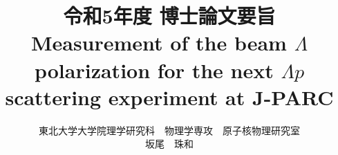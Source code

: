 \documentclass[a4paper,11pt,twoside,twocolumn]{article}
\begin{document}
\newcommand{\XM}{\Xi^{-}}
\newcommand{\Xz}{\Xi^{0}}

\newcommand{\pM}{\pi^{-}}
\newcommand{\pP}{\pi^{+}}
\newcommand{\pZ}{\pi^{0}}
\newcommand{\pPM}{\pi^{\pm}}
\newcommand{\KP}{K^{+}}
\newcommand{\KM}{K^{-}}
\newcommand{\Kz}{K^{0}}
\newcommand{\Lp}{\Lambda p}
\newcommand{\LpLX}{\Lambda p \to \Lambda X}

\newcommand{\LN}{\Lambda N}
\newcommand{\SN}{\Sigma N}
\newcommand{\LNtoSN}{\Lambda N\to\Sigma N}
\newcommand{\LS}{\Lambda - \Sigma}


\newcommand{\dcs}{d\sigma/d\Omega}
\newcommand{\fdcs}{\frac{d\sigma}{d\Omega}}
\newcommand{\dz}{\Delta z}
\newcommand{\dzkz}{\Delta z_{K^{0}}}


\newcommand{\bgct}{\beta\gamma c\tau}

\newcommand{\costp}{\cos{\theta_p}}
\newcommand{\costkz}{\cos{\theta_{K0,CM}}}
\newcommand{\costcm}{\cos{\theta}_{CM}}
\newcommand{\PL}{P_{\Lambda}}
\newcommand{\PLall}{P_{\Lambda,\ all}}
\newcommand{\PLsele}{P_{\Lambda,\ selected}}
\newcommand{\errPL}{\sigma(P_{\Lambda})}

\newcommand{\rud}{r_{ud}}
\newcommand{\errrud}{\sigma(\rud)}

\newcommand{\accPL}{\epsilon_{\PL}}
\newcommand{\erraccPL}{\sigma(\epsilon_{\PL})}

\newcommand{\PLscat}{P_{\Lambda'}}
\newcommand{\effPLw}{\epsilon_{\PL,\ w/}}
\newcommand{\erreffPLw}{\sigma(\epsilon_{\PL,\ w/})}
\newcommand{\effPLwo}{\epsilon_{\PL,\ w/o}}
\newcommand{\erreffPLwo}{\sigma(\epsilon_{\PL,\ w/o})}

\newcommand{\chisq}{\chi^{2}}
\newcommand*{\rom}[1]{\expandafter\@slowromancap\romannumeral #1@}
\makeatother

\vspace{-50pt}
\title{{\small 令和5年度 博士論文要旨} \\ %
Measurement of the beam $\Lambda$ polarization for the next $\Lp$ scattering experiment at J-PARC}
\author{東北大学大学院理学研究科　物理学専攻　原子核物理研究室\\ 坂尾　珠和}
\maketitle

\end{document}
